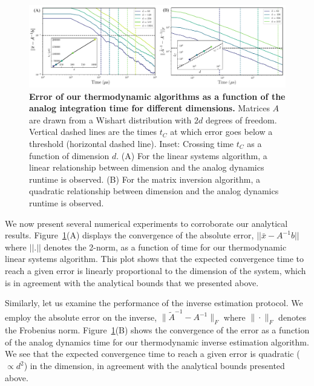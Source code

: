 \documentclass[prx,onecolumn,floatfix,longbibliography,notitlepage, nofootinbib,12pt]{revtex4-2}
\begin{document}
\begin{figure}[t]
    \centering
    \includegraphics[width=0.98\linewidth]{figures/TLA_times.pdf}
    \caption{\textbf{Error of our thermodynamic algorithms as a function of the analog integration time for different dimensions.} Matrices $A$ are drawn from a Wishart distribution with $2d$ degrees of freedom. Vertical dashed lines are the times $t_C$ at which error goes below a threshold (horizontal dashed line). Inset: Crossing time $t_C$ as a function of dimension $d$. (A) For the linear systems algorithm, a linear relationship between dimension and the analog dynamics runtime is observed.
    (B) For the matrix inversion algorithm, a quadratic relationship between dimension and the analog dynamics runtime is observed.}
    \label{fig:ErrorVsAnalogTime}
\end{figure}



We now present several numerical experiments to corroborate our analytical results. Figure~\ref{fig:ErrorVsAnalogTime}(A) displays the convergence of the absolute error, $||\bar{x} - A^{-1}b||$ where $||.||$ denotes the 2-norm, as a function of time for our thermodynamic linear systems algorithm. This plot shows that the expected convergence time to reach a given error is linearly proportional to the dimension of the system, which is in agreement with the analytical bounds that we presented above.

Similarly, let us examine the performance of the inverse estimation protocol. We employ the absolute error on the inverse, $ \|\tilde{A}^{-1} - A^{-1}\|_F$ where $\|\cdot\|_F$ denotes the Frobenius norm. Figure~\ref{fig:ErrorVsAnalogTime}(B) shows the convergence of the error as a function of the analog dynamics time for our thermodynamic inverse estimation algorithm. We see that the expected convergence time to reach a given error is quadratic ($\propto d^2$) in the dimension, in agreement with the analytical bounds presented above.
\end{document}
